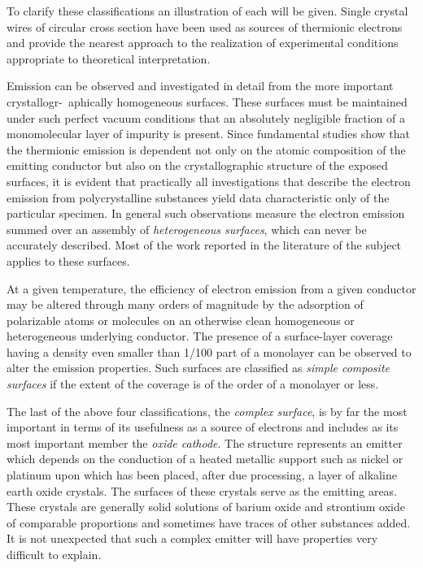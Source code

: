 \documentclass[11pt,a4paper]{article}
\begin{document}
	To clarify these classifications an illustration of each will be given. Single
	crystal wires of circular cross section have been used as sources of thermionic
	electrons and provide the nearest approach to the realization of experimental
	conditions appropriate to theoretical interpretation.
	
	Emission can be observed and investigated in detail from the more important crystallogr-\ aphically homogeneous surfaces. These surfaces must be maintained
	under such perfect vacuum conditions that an absolutely negligible fraction of
	a monomolecular layer of impurity is present. Since fundamental studies show
	that the thermionic emission is dependent not only on the atomic composition
	of the emitting conductor but also on the crystallographic structure of the exposed surfaces, it is evident that practically all investigations that describe the
	electron emission from polycrystalline substances yield data characteristic only
	of the particular specimen. In general such observations measure the electron
	emission summed over an assembly of \emph{heterogeneous surfaces}, which can never
	be accurately described. Most of the work reported in the literature of the subject applies to these surfaces.
	
	At a given temperature, the efficiency of electron emission from a given
	conductor may be altered through many orders of magnitude by the adsorption
	of polarizable atoms or molecules on an otherwise clean homogeneous or heterogeneous underlying conductor. The presence of a surface-layer coverage having a
	density even smaller than 1/100 part of a monolayer can be observed to alter the
	emission properties. Such surfaces are classified as \emph{simple composite surfaces} if the extent of the coverage is of the order of a monolayer or less.
	
	The last of the above four classifications, the \emph{complex surface}, is by far the
	most important in terms of its usefulness as a source of electrons and includes
	as its most important member the \emph{oxide cathode}. The structure represents an
	emitter which depends on the conduction of a heated metallic support such as
	nickel or platinum upon which has been placed, after due processing, a layer of
	alkaline earth oxide crystals. The surfaces of these crystals serve as the emitting
	areas. These crystals are generally solid solutions of barium oxide and strontium
	oxide of comparable proportions and sometimes have traces of other substances
	added. It is not unexpected that such a complex emitter will have properties very
	difficult to explain.
	
\end{document}
